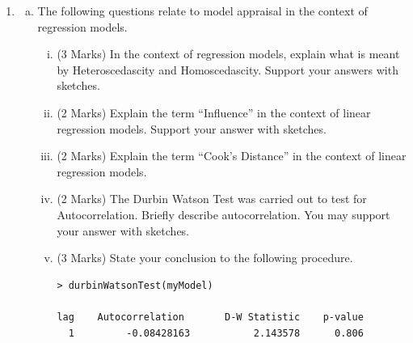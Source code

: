 \documentclass[a4paper,12pt]{article}
\begin{document}
\begin{enumerate}
\item 
\begin{enumerate}[(a)]
\item The following questions relate to model appraisal in the context of regression models.
%
\begin{enumerate}[(i)]

\item (3 Marks) In the context of regression models, explain what is meant by Heteroscedascity and Homoscedascity. Support your answers with sketches.
\item (2 Marks) Explain the term “Influence” in the context of linear regression models. Support your
answer with sketches.
\item (2 Marks) Explain the term “Cook’s Distance” in the context of linear regression models.
\item (2 Marks) The Durbin Watson Test was carried out to test for Autocorrelation. Briefly describe
autocorrelation. You may support your answer with sketches.
\item (3 Marks) State your conclusion to the following procedure.
\begin{framed}
\begin{verbatim}
> durbinWatsonTest(myModel)

lag    Autocorrelation       D-W Statistic    p-value
  1         -0.08428163           2.143578      0.806


\end{verbatim}
\end{framed}
\end{enumerate}
\end{enumerate}
\end{enumerate}
\end{document}
